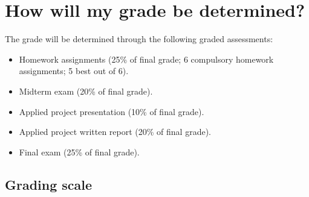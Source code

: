 \documentclass[11pt]{article}
\begin{document}

\section{How will my grade be determined?}

The grade will be determined through the following graded assessments:

\begin{itemize}[label={-},noitemsep]
  \item Homework assignments (25\% of final grade; 6 compulsory homework assignments; 5 best out of 6). 
  \item Midterm exam (20\% of final grade).
  \item Applied project presentation (10\% of final grade).
  \item Applied project written report (20\% of final grade).
  \item Final exam (25\% of final grade).
\end{itemize}

\subsection{Grading scale}

\end{document}
